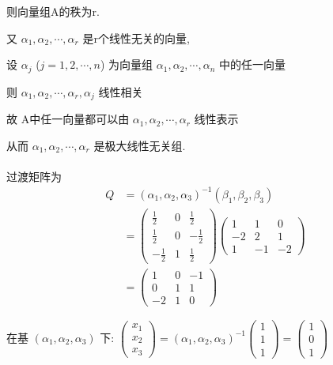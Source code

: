 		 则向量组A的秩为r.

		 又 \( \alpha_{1}, \alpha_{2}, \cdots, \alpha_{r} \) 是r个线性无关的向量,

		 设 \( \alpha_{j} \) (\( j=1,2,\cdots,n \)) 为向量组 \( \alpha_{1}, \alpha_{2}, \cdots, \alpha_{n} \) 中的任一向量

		 则 \( \alpha_{1}, \alpha_{2}, \cdots, \alpha_{r}, \alpha_{j} \) 线性相关

		 故 A中任一向量都可以由 \( \alpha_{1}, \alpha_{2}, \cdots, \alpha_{r} \) 线性表示

		 从而 \( \alpha_{1}, \alpha_{2}, \cdots, \alpha_{r} \) 是极大线性无关组.

	 \paragraph{} %
		 过渡矩阵为
		 \[ \begin{aligned}
				 Q & = (\alpha_{1}, \alpha_{2}, \alpha_{3})^{-1}(\beta_{1}, \beta_{2}, \beta_{3}) \\
				   & =
				 \begin{pmatrix}
					 \frac{1}{2}  & 0 & \frac{1}{2}  \\
					 \frac{1}{2}  & 0 & -\frac{1}{2} \\
					 -\frac{1}{2} & 1 & \frac{1}{2}\end{pmatrix}
				 \begin{pmatrix}
					 1  & 1  & 0  \\
					 -2 & 2  & 1  \\
					 1  & -1 & -2\end{pmatrix}                                                        \\
				   & =
				 \begin{pmatrix}
					 1  & 0 & -1 \\
					 0  & 1 & 1  \\
					 -2 & 1 & 0\end{pmatrix}
			 \end{aligned} \]

		 在基 \( (\alpha_{1}, \alpha_{2}, \alpha_{3}) \) 下: \(
		 \begin{pmatrix}
			 x_{1} \\
			 x_{2} \\
			 x_{3}\end{pmatrix} = (\alpha_{1}, \alpha_{2}, \alpha_{3})^{-1}
		 \begin{pmatrix}
			 1 \\
			 1 \\
			 1\end{pmatrix} =
		 \begin{pmatrix}
			 1 \\
			 0 \\
			 1\end{pmatrix} \)

